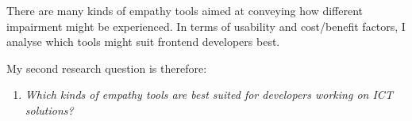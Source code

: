 


There are many kinds of empathy tools aimed at conveying how different impairment might be experienced. In terms of usability and cost/benefit factors, I analyse which tools might suit frontend developers best.

My second research question is therefore:
\begin{enumerate}\addtocounter{enumi}{1}
\item \textit{Which kinds of empathy tools are best suited for developers working on ICT solutions?}
\end{enumerate} 

